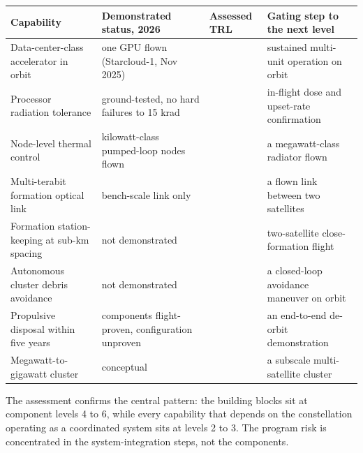 \documentclass[
  11pt,
  openany,
  oneside]{book}
\newcounter{none} %
\begin{document}
{\def\LTcaptype{none} %
\begin{longtable}[]{@{}
  >{\raggedright\arraybackslash}p{}
  >{\raggedright\arraybackslash}p{}
  >{\raggedright\arraybackslash}p{}
  >{\raggedright\arraybackslash}p{}@{}}
\toprule\noalign{}
\begin{minipage}[b]{\linewidth}\raggedright
Capability
\end{minipage} & \begin{minipage}[b]{\linewidth}\raggedright
Demonstrated status, 2026
\end{minipage} & \begin{minipage}[b]{\linewidth}\raggedright
Assessed TRL
\end{minipage} & \begin{minipage}[b]{\linewidth}\raggedright
Gating step to the next level
\end{minipage} \\
\midrule\noalign{}
\endhead
\bottomrule\noalign{}
\endlastfoot
Data-center-class accelerator in orbit & one GPU flown (Starcloud-1, Nov
2025) & 6 & sustained multi-unit operation on orbit \\
Processor radiation tolerance & ground-tested, no hard failures to 15
krad & 5 & in-flight dose and upset-rate confirmation \\
Node-level thermal control & kilowatt-class pumped-loop nodes flown & 5
& a megawatt-class radiator flown \\
Multi-terabit formation optical link & bench-scale link only & 4 & a
flown link between two satellites \\
Formation station-keeping at sub-km spacing & not demonstrated & 3 &
two-satellite close-formation flight \\
Autonomous cluster debris avoidance & not demonstrated & 2 & a
closed-loop avoidance maneuver on orbit \\
Propulsive disposal within five years & components flight-proven,
configuration unproven & 5 & an end-to-end de-orbit demonstration \\
Megawatt-to-gigawatt cluster & conceptual & 2 & a subscale
multi-satellite cluster \\
\end{longtable}
}

The assessment confirms the central pattern: the building blocks sit at
component levels 4 to 6, while every capability that depends on the
constellation operating as a coordinated system sits at levels 2 to 3.
The program risk is concentrated in the system-integration steps, not
the components.
\end{document}
